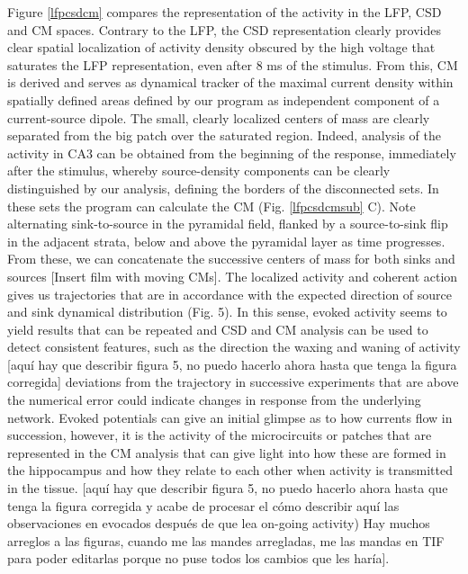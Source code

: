 \documentclass[letterpaper,12pts]{article}
\newcommand{\romment}[1]{{\color{blue} [#1]}}
\begin{document}
Figure \ref{lfpcsdcm} compares the representation of the activity in the LFP, CSD and CM spaces. Contrary to the LFP, the CSD representation clearly provides clear spatial localization of activity density obscured by the high voltage that saturates the LFP representation, even after 8 ms of the stimulus. From this, CM is derived and serves as dynamical tracker of the maximal current density within spatially defined areas defined by our program as independent component of a current-source dipole. The small, clearly localized centers of mass are clearly separated from the big patch over the saturated region. Indeed, analysis of the activity in CA3 can be obtained from the beginning of the response, immediately after the stimulus, whereby source-density components can be clearly distinguished by our analysis, defining the borders of the disconnected sets. In these sets the program can calculate the CM (Fig. \ref{lfpcsdcmsub} C). Note alternating sink-to-source in the pyramidal field, flanked by a source-to-sink flip in the adjacent strata, below and above the pyramidal layer as time progresses. From these, we can concatenate the successive centers of mass for both sinks and sources \romment{Insert film with moving CMs}.
The localized activity and coherent action gives us trajectories that are in accordance with the expected direction of source and sink dynamical distribution (Fig. 5). In this sense, evoked activity seems to yield results that can be repeated and CSD and CM analysis can be used to detect consistent features, such as the direction the waxing and waning of activity \romment{aquí hay que describir figura 5, no puedo hacerlo ahora hasta que tenga la figura corregida} deviations from the trajectory in successive experiments that are above the numerical error could indicate changes in response from the underlying network. Evoked potentials can give an initial glimpse as to how currents flow in succession, however, it is the activity of the microcircuits or patches that are represented in the CM analysis that can give light into how these are formed in the hippocampus and how they relate to each other when activity is transmitted in the tissue. \romment{aquí hay que describir figura 5, no puedo hacerlo ahora hasta que tenga la figura corregida y acabe de procesar el cómo describir aquí las observaciones en evocados después de que lea on-going activity) Hay muchos arreglos a las figuras, cuando me las mandes arregladas, me las mandas en TIF para poder editarlas porque no puse todos los cambios que les haría}.
\end{document}
